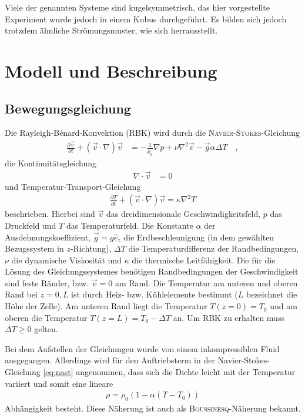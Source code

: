 \documentclass[12pt,a4paper,titlepage,headinclude]{scrartcl}
\numberwithin{equation}{subsection}
\begin{document}
Viele der genannten Systeme sind kugelsymmetrisch, das hier vorgestellte Experiment wurde jedoch in einem Kubus durchgeführt.
Es bilden sich jedoch trotzdem ähnliche Strömungsmuster, wie sich herrausstellt.


\newpage
\section{Modell und Beschreibung}
\label{sec:theorie}

\subsection{Bewegungsgleichung}
Die Rayleigh-Bénard-Konvektion (RBK) wird durch die \textsc{Navier-Stokes}-Gleichung
\begin{align}
	\frac{\partial \vec{v}}{\partial t} + \left(\vec{v}\cdot\nabla\right)\vec{v} &= 
	-\frac{1}{\rho_0}\nabla p+\nu\nabla^2\vec{v}-\vec{g}\alpha\Delta T\quad,\label{eq:nast}
\end{align}
die Kontinuitätsgleichung
\begin{align}
	\nabla\cdot\vec{v} &= 0\label{eq:konti}
\end{align}
und Temperatur-Transport-Gleichung  
\begin{align}
	\frac{\partial T}{\partial t} + \left( \vec{v}\cdot\nabla \right)\vec{v} = \kappa\nabla^2T\label{eq:tempera}
\end{align}
beschrieben.
Hierbei sind $\vec{v}$ das dreidimensionale Geschwindigkeitsfeld, $p$ das Druckfeld und $T$ das Temperaturfeld.
Die Konstante $\alpha$ der Ausdehnungskoeffizient, $\vec{g}=g\hat{e}_z$ die Erdbeschleunigung (in dem gewählten Bezugssystem in $z$-Richtung), $\Delta T$ die Temperaturdifferenz der Randbedingungen, $\nu$ die dynamische Viskosität und $\kappa$ die thermische Leitfähigkeit.
Die für die Lösung des Gleichungssystemes benötigen Randbedingungen der Geschwindigkeit sind feste Ränder, bzw. $\vec{v}=0$ am Rand.
Die Temperatur am unteren und oberen Rand bei $z=0,L$ ist durch Heiz- bzw. Kühlelemente bestimmt ($L$ bezeichnet die Höhe der Zelle).
Am unteren Rand liegt die Temperatur $T(z=0)=T_0$ und am oberen die Temperatur $T(z=L)=T_0-\Delta T$ an.
Um RBK zu erhalten muss $\Delta T\geq0$ gelten.

Bei dem Aufstellen der Gleichungen wurde von einem inkompressiblen Fluid ausgegangen.
Allerdings wird für den Auftriebsterm in der Navier-Stokes-Gleichung \eqref{eq:nast} angenommen, dass sich die Dichte leicht mit der Temperatur variiert und somit eine lineare
\begin{align*}
	\rho=\rho_0\left( 1 - \alpha\left( T - T_0 \right) \right)
\end{align*}
Abhängigkeit besteht.
Diese Näherung ist auch als \textsc{Boussinesq}-Näherung bekannt.
\end{document}
